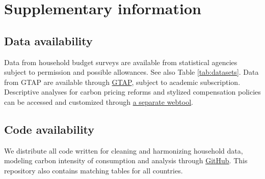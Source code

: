 \documentclass[12pt, a4paper]{article}
\begin{document}
\begin{refsection}

\clearpage


\clearpage


\clearpage


\clearpage


\clearpage


\clearpage


\clearpage

\begin{refcontext}[sorting=nyt]
\printbibliography[heading=subbibliography, title ={References (Appendix)}]
\end{refcontext}
\end{refsection}

\clearpage

\section{Supplementary information}

\subsection{Data availability} \label{data_availability} Data from household budget surveys are available from statistical agencies subject to permission and possible allowances. See also Table \ref{tab:datasets}. Data from GTAP are available through \href{https://www.gtap.agecon.purdue.edu/}{GTAP}, subject to academic subscription.
Descriptive analyses for carbon pricing reforms and stylized compensation policies can be accessed and customized through \href{https://https://www.cpic-global.net/}{a separate webtool}.

\subsection{Code availability} \label{code}
We distribute all code written for cleaning and harmonizing household data, modeling carbon intensity of consumption and analysis through \href{https://github.com/lmissbach/Carbon-Intensity-2023}{GitHub}. This repository also contains matching tables for all countries.
\end{document}
